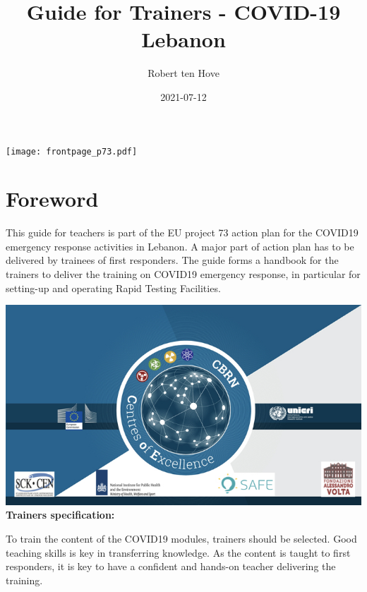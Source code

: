 \documentclass[
]{book}
\title{Guide for Trainers - COVID-19 Lebanon}
\author{Robert ten Hove}
\date{2021-07-12}
\let\oldmaketitle\maketitle
\begin{document}
\maketitle

\thispagestyle{empty}
\begin{center}
\texttt{[image: frontpage\_p73.pdf]}
\end{center}

\let\maketitle\oldmaketitle
\maketitle

{
\setcounter{tocdepth}{1}
\tableofcontents
}
\hypertarget{foreword}{%
\chapter{Foreword}\label{foreword}}

This guide for teachers is part of the EU project 73 action plan for the
COVID19 emergency response activities in Lebanon. A major part of action
plan has to be delivered by trainees of first responders. The guide
forms a handbook for the trainers to deliver the training on COVID19
emergency response, in particular for setting-up and operating Rapid Testing Facilities.

\includegraphics{images/CoE.jpeg}\\
\textbf{Trainers specification:}

To train the content of the COVID19 modules, trainers should be
selected. Good teaching skills is key in transferring knowledge. As the
content is taught to first responders, it is key to have a confident and
hands-on teacher delivering the training.
\end{document}
